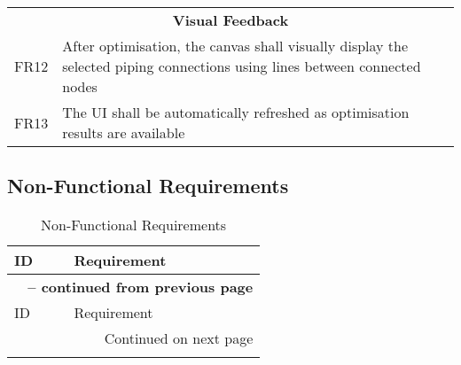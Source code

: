 \begin{longtable}{l p{13cm}}
\midrule
\multicolumn{2}{c}{\textbf{Visual Feedback}} \\
FR12 & After optimisation, the canvas shall visually display the selected piping connections using lines between connected nodes \\
FR13 & The UI shall be automatically refreshed as optimisation results are available \\
\end{longtable}


\subsection{Non-Functional Requirements}

\begin{longtable}{l p{13cm}}
\caption{Non-Functional Requirements}\label{table:nonfunctionalrequirements} \\
\toprule
ID & Requirement \\
\midrule
\endfirsthead

\multicolumn{2}{c}{{\bfseries \tablename\ \thetable{} -- continued from previous page}} \\
\toprule
ID & Requirement \\
\midrule
\endhead

\midrule \multicolumn{2}{r}{{Continued on next page}} \\
\endfoot

\bottomrule
\endlastfoot


\end{longtable}
